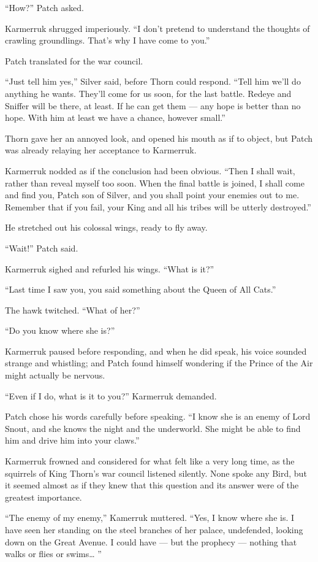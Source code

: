 \documentclass[ebook,oneside,openany,17pt]{memoir}
\begin{document}
“How?” Patch asked.

Karmerruk shrugged imperiously. “I don’t pretend to understand the
thoughts of crawling groundlings. That’s why I have come to you.”

Patch translated for the war council.

“Just tell him yes,” Silver said, before Thorn could respond. “Tell
him we’ll do anything he wants. They’ll come for us soon, for the last
battle. Redeye and Sniffer will be there, at least. If he can get them
— any hope is better than no hope. With him at least we have a chance,
however small.”

Thorn gave her an annoyed look, and opened his mouth as if to object,
but Patch was already relaying her acceptance to Karmerruk.

Karmerruk nodded as if the conclusion had been obvious. “Then I shall
wait, rather than reveal myself too soon. When the final battle is
joined, I shall come and find you, Patch son of Silver, and you shall
point your enemies out to me. Remember that if you fail, your King and
all his tribes will be utterly destroyed.”

He stretched out his colossal wings, ready to fly away.

“Wait!” Patch said.

Karmerruk sighed and refurled his wings. “What is it?”

“Last time I saw you, you said something about the Queen of All Cats.”

The hawk twitched. “What of her?”

“Do you know where she is?”

Karmerruk paused before responding, and when he did speak, his voice
sounded strange and whistling; and Patch found himself wondering if
the Prince of the Air might actually be nervous.

“Even if I do, what is it to you?” Karmerruk demanded.

Patch chose his words carefully before speaking. “I know she is an
enemy of Lord Snout, and she knows the night and the underworld. She
might be able to find him and drive him into your claws.”

Karmerruk frowned and considered for what felt like a very long time,
as the squirrels of King Thorn’s war council listened silently. None
spoke any Bird, but it seemed almost as if they knew that this
question and its answer were of the greatest importance.

“The enemy of my enemy,” Kamerruk muttered. “Yes, I know where she
is. I have seen her standing on the steel branches of her palace,
undefended, looking down on the Great Avenue. I could have — but the
prophecy — nothing that walks or flies or swims… ”
\end{document}
